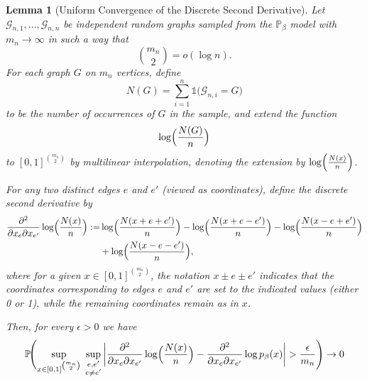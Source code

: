 \documentclass[12pt]{article}
\numberwithin{equation}{section}
\newtheorem{lemma}{Lemma}[section]
\begin{document}
\begin{lemma}[Uniform Convergence of the Discrete Second Derivative]{\label{weak_law_2der}}
Let \(\mathcal{G}_{n,1}, \dots, \mathcal{G}_{n,n}\) be independent random graphs sampled from the \(\mathbb{P}_{\beta}\) model with \(m_n\to\infty\) in such a way that
\[
\binom{m_n}{2} = o(\log n).
\]
For each graph \(G\) on \(m_n\) vertices, define
\[
N(G)=\sum_{i=1}^{n} \mathds{1}\bigl(\mathcal{G}_{n,i}=G\bigr)
\]
to be the number of occurrences of \(G\) in the sample, and extend the function
\[
\log\Bigl(\frac{N(G)}{n}\Bigr)
\]
to \([0,1]^{\binom{m_n}{2}}\) by multilinear interpolation, denoting the extension by \(\log\Bigl(\frac{N(x)}{n}\Bigr)\).

For any two distinct edges \(e\) and \(e'\) (viewed as coordinates), define the discrete second derivative by
\begin{align*}
\frac{\partial^2}{\partial x_{e}\partial x_{e'}} \log\Bigl(\frac{N(x)}{n}\Bigr) :=& \log\Bigl(\frac{N(x+e+e')}{n}\Bigr) - \log\Bigl(\frac{N(x+e-e')}{n}\Bigr) - \log\Bigl(\frac{N(x-e+e')}{n}\Bigr)\\
&+ \log\Bigl(\frac{N(x-e-e')}{n}\Bigr),
\end{align*}
where for a given \(x\in [0,1]^{\binom{m_n}{2}}\), the notation \(x\pm e \pm e'\) indicates that the coordinates corresponding to edges \(e\) and \(e'\) are set to the indicated values (either 0 or 1), while the remaining coordinates remain as in \(x\).

Then, for every \(\epsilon>0\) we have
\[
\mathbb{P}\!\Biggl(\sup_{x\in [0,1]^{\binom{m_n}{2}}}\; \sup_{\substack{e,e'\\e\neq e'}} \left|\frac{\partial^2}{\partial x_{e}\partial x_{e'}} \log\Bigl(\frac{N(x)}{n}\Bigr) - \frac{\partial^2}{\partial x_{e}\partial x_{e'}} \log p_{\beta}(x)\right | > \frac{\epsilon}{m_n}\Biggr)
\rightarrow 0
\]

\end{lemma}
\end{document}
